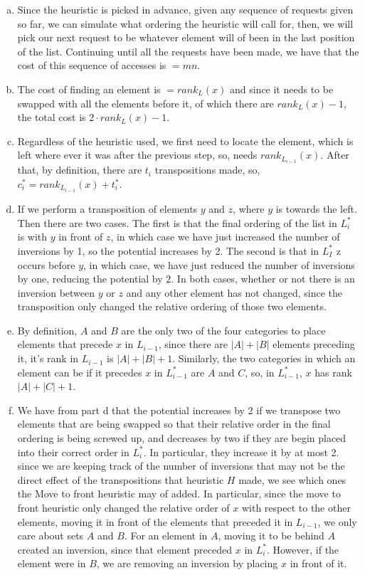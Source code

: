 \documentclass{article}
\begin{document}
\begin{enumerate}[a.]
\item 
Since the heuristic is picked in advance, given any sequence of requests given so far, we can simulate what ordering the heuristic will call for, then, we will pick our next request to be whatever element will of been in the last position of the list. Continuing until all the requests have been made, we have that the cost of this sequence of accesses is $=mn$.

\item
The cost of finding an element is $=rank_L(x)$ and since it needs to be swapped with all the elements before it, of which there are $rank_L(x)-1$, the total cost is $2\cdot rank_L(x)-1$.

\item
Regardless of the heuristic used, we first need to locate the element, which is left where ever it was after the previous step, so, needs $rank_{L_{i-1}}(x)$. After that, by definition, there are $t_i$ transpositions made, so, $c_i^* = rank_{L_{i-1}}(x) + t_i^*$.

\item
If we perform a transposition of elements $y$ and $z$, where $y$ is towards the left. Then there are two cases. The first is that the final ordering of the list in $L_i^*$ is with $y$ in front of $z$, in which case we have just increased the number of inversions by 1, so the potential increases by 2. The second is that in $L_I^*$ z occurs before $y$, in which case, we have just reduced the number of inversions by one, reducing the potential by 2. In both cases, whether or not there is an inversion between $y$ or $z$ and any other element has not changed, since the transposition only changed the relative ordering of those two elements.

\item
By definition, $A$ and $B$ are the only two of the four categories to place elements that precede $x$ in $L_{i-1}$, since there are $|A|+|B|$ elements preceding it, it's rank in $L_{i-1}$ is $|A|+|B|+1$. Similarly, the two categories in which an element can be if it precedes $x$ in $L_{i-1}^*$ are $A$ and $C$, so, in $L_{i-1}^*$, $x$ has rank $|A|+|C|+1$.

\item
We have from part d that the potential increases by 2 if we transpose two elements that are being swapped so that their relative order in the final ordering is being screwed up, and decreases by two if they are begin placed into their correct order in $L_i^*$. In particular, they increase it by at most 2. since we are keeping track of the number of inversions that may not be the direct effect of the transpositions that heuristic $H$ made, we see which ones the Move to front heuristic may of added. In particular, since the move to front heuristic only changed the relative order of $x$ with respect to the other elements, moving it in front of the elements that preceded it in $L_{i-1}$, we only care about sets $A$ and $B$. For an element in $A$, moving it to be behind $A$ created an inversion, since that element preceded $x$ in $L_i^*$. However, if the element were in $B$, we are removing an inversion by placing $x$ in front of it.


\end{enumerate}
\end{document}
